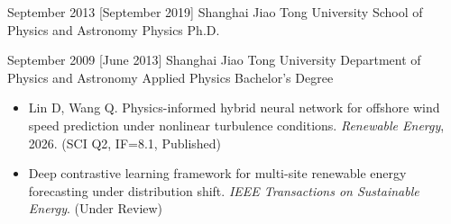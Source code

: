 \documentclass{resume}
\begin{document}
\makeheader

\begin{abstract}
Highly-motivated Ph.D. in Physics (radio astronomy)
with good foundations of math and statistics.
Proficient in data modeling and analysis,
and enthusiastic about computer and network technologies.
With 10 years experience in Linux and BSD,
skilled in Shell, Python, and C programming.
Passionate about open source and share multiple projects on my
.
Meanwhile a 
operating system developer and a contributor to several other
open source projects.
\end{abstract}

\begin{educations}
  \education%
    {September 2013}%
    [September 2019]%
    {Shanghai Jiao Tong University}%
    {School of Physics and Astronomy}%
    {Physics}%
    {Ph.D.}

  \separator{0.5ex}
  \education%
    {September 2009}%
    [June 2013]%
    {Shanghai Jiao Tong University}%
    {Department of Physics and Astronomy}%
    {Applied Physics}%
    {Bachelor's Degree}
\end{educations}

\begin{itemize}
\item Lin D, Wang Q. Physics-informed hybrid neural network for offshore wind speed prediction under nonlinear turbulence conditions. \textit{Renewable Energy}, 2026. (SCI Q2, IF=8.1, Published)
\item Deep contrastive learning framework for multi-site renewable energy forecasting under distribution shift. \textit{IEEE Transactions on Sustainable Energy}. (Under Review)
\end{itemize}
\end{document}
